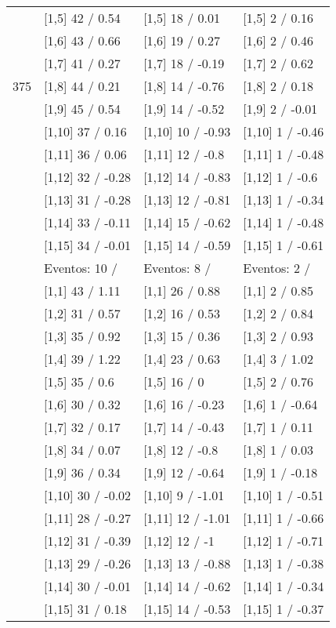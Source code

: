 \begin{table}
\begin{tabular}[t]{llll}
 & {}[1,5] 42  / 0.54 & {}[1,5] 18  / 0.01 & {}[1,5] 2  / 0.16\\
 & {}[1,6] 43  / 0.66 & {}[1,6] 19  / 0.27 & {}[1,6] 2  / 0.46\\
 & {}[1,7] 41  / 0.27 & {}[1,7] 18  / -0.19 & {}[1,7] 2  / 0.62\\
375 & {}[1,8] 44  / 0.21 & {}[1,8] 14  / -0.76 & {}[1,8] 2  / 0.18\\
\addlinespace
 & {}[1,9] 45  / 0.54 & {}[1,9] 14  / -0.52 & {}[1,9] 2  / -0.01\\
 & {}[1,10] 37  / 0.16 & {}[1,10] 10  / -0.93 & {}[1,10] 1  / -0.46\\
 & {}[1,11] 36  / 0.06 & {}[1,11] 12  / -0.8 & {}[1,11] 1  / -0.48\\
 & {}[1,12] 32  / -0.28 & {}[1,12] 14  / -0.83 & {}[1,12] 1  / -0.6\\
 & {}[1,13] 31  / -0.28 & {}[1,13] 12  / -0.81 & {}[1,13] 1  / -0.34\\
\addlinespace
 & {}[1,14] 33  / -0.11 & {}[1,14] 15  / -0.62 & {}[1,14] 1  / -0.48\\
 & {}[1,15] 34  / -0.01 & {}[1,15] 14  / -0.59 & {}[1,15] 1  / -0.61\\
 & Eventos:  10 / & Eventos:  8 / & Eventos:  2 /\\
 & {}[1,1] 43  / 1.11 & {}[1,1] 26  / 0.88 & {}[1,1] 2  / 0.85\\
 & {}[1,2] 31  / 0.57 & {}[1,2] 16  / 0.53 & {}[1,2] 2  / 0.84\\
\addlinespace
 & {}[1,3] 35  / 0.92 & {}[1,3] 15  / 0.36 & {}[1,3] 2  / 0.93\\
 & {}[1,4] 39  / 1.22 & {}[1,4] 23  / 0.63 & {}[1,4] 3  / 1.02\\
 & {}[1,5] 35  / 0.6 & {}[1,5] 16  / 0 & {}[1,5] 2  / 0.76\\
 & {}[1,6] 30  / 0.32 & {}[1,6] 16  / -0.23 & {}[1,6] 1  / -0.64\\
 & {}[1,7] 32  / 0.17 & {}[1,7] 14  / -0.43 & {}[1,7] 1  / 0.11\\
\addlinespace
500 & {}[1,8] 34  / 0.07 & {}[1,8] 12  / -0.8 & {}[1,8] 1  / 0.03\\
 & {}[1,9] 36  / 0.34 & {}[1,9] 12  / -0.64 & {}[1,9] 1  / -0.18\\
 & {}[1,10] 30  / -0.02 & {}[1,10] 9  / -1.01 & {}[1,10] 1  / -0.51\\
 & {}[1,11] 28  / -0.27 & {}[1,11] 12  / -1.01 & {}[1,11] 1  / -0.66\\
 & {}[1,12] 31  / -0.39 & {}[1,12] 12  / -1 & {}[1,12] 1  / -0.71\\
\addlinespace
 & {}[1,13] 29  / -0.26 & {}[1,13] 13  / -0.88 & {}[1,13] 1  / -0.38\\
 & {}[1,14] 30  / -0.01 & {}[1,14] 14  / -0.62 & {}[1,14] 1  / -0.34\\
 & {}[1,15] 31  / 0.18 & {}[1,15] 14  / -0.53 & {}[1,15] 1  / -0.37\\
\bottomrule
\end{tabular}
\end{table}
